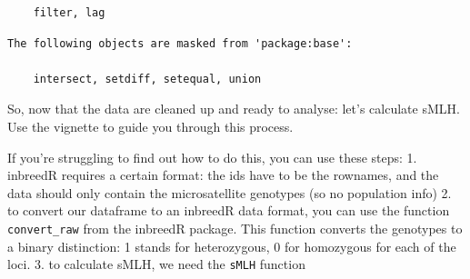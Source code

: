 \documentclass[
  letterpaper,
  DIV=11,
  numbers=noendperiod]{scrreprt}
\newenvironment{Shaded}{}{}
\newcommand{\AttributeTok}[1]{\textcolor[rgb]{0.84,0.23,0.29}{#1}}
\newcommand{\CommentTok}[1]{\textcolor[rgb]{0.42,0.45,0.49}{#1}}
\newcommand{\DecValTok}[1]{\textcolor[rgb]{0.00,0.36,0.77}{#1}}
\newcommand{\DocumentationTok}[1]{\textcolor[rgb]{0.42,0.45,0.49}{#1}}
\newcommand{\FunctionTok}[1]{\textcolor[rgb]{0.44,0.26,0.76}{#1}}
\newcommand{\NormalTok}[1]{\textcolor[rgb]{0.14,0.16,0.18}{#1}}
\newcommand{\OtherTok}[1]{\textcolor[rgb]{0.44,0.26,0.76}{#1}}
\newcommand{\SpecialCharTok}[1]{\textcolor[rgb]{0.00,0.36,0.77}{#1}}
\newcommand{\StringTok}[1]{\textcolor[rgb]{0.01,0.18,0.38}{#1}}
\begin{document}
\begin{tcolorbox}
\begin{verbatim}
    filter, lag
\end{verbatim}

\begin{verbatim}
The following objects are masked from 'package:base':

    intersect, setdiff, setequal, union
\end{verbatim}

\begin{Shaded}
\end{Shaded}

\end{tcolorbox}

So, now that the data are cleaned up and ready to analyse: let's
calculate sMLH. Use the vignette to guide you through this process.

\begin{tcolorbox}[enhanced jigsaw, arc=.35mm, left=2mm, titlerule=0mm, rightrule=.15mm, colframe=quarto-callout-tip-color-frame, coltitle=black, colback=white, opacityback=0, bottomtitle=1mm, bottomrule=.15mm, colbacktitle=quarto-callout-tip-color!10!white, breakable, title=\textcolor{quarto-callout-tip-color}{\faLightbulb}\hspace{0.5em}{Tips}, toptitle=1mm, toprule=.15mm, opacitybacktitle=0.6, leftrule=.75mm]

If you're struggling to find out how to do this, you can use these
steps: 1. inbreedR requires a certain format: the ids have to be the
rownames, and the data should only contain the microsatellite genotypes
(so no population info) 2. to convert our dataframe to an inbreedR data
format, you can use the function \texttt{convert\_raw} from the inbreedR
package. This function converts the genotypes to a binary distinction: 1
stands for heterozygous, 0 for homozygous for each of the loci. 3. to
calculate sMLH, we need the \texttt{sMLH} function

\end{tcolorbox}
\end{document}
